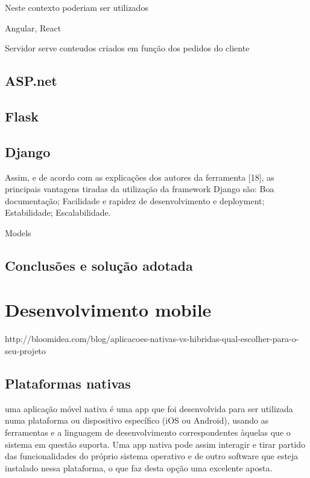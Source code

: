 Neste contexto poderiam ser utilizados 


Angular, React

Servidor serve conteudos criados em função dos pedidos do cliente 







\subsection{ASP.net}

\subsection{Flask}

\subsection{Django}


Assim, e de acordo com as explicações dos autores da ferramenta [18], as
principais vantagens tiradas da utilização da framework Django são:
Boa documentação;
Facilidade e rapidez de desenvolvimento e deployment;
Estabilidade;
Escalabilidade.




Models 


\subsection{Conclusões e solução adotada}



\newpage
\section{Desenvolvimento mobile}


http://bloomidea.com/blog/aplicacoes-nativas-vs-hibridas-qual-escolher-para-o-seu-projeto	

\subsection{Plataformas nativas}


uma aplicação móvel nativa é uma app que foi desenvolvida para ser utilizada numa plataforma ou dispositivo específico (iOS ou Android), usando as ferramentas e a linguagem de desenvolvimento correspondentes àquelas que o sistema em questão suporta. Uma app nativa pode assim interagir e tirar partido das funcionalidades do próprio sistema operativo e de outro software que esteja instalado nessa plataforma, o que faz desta opção uma excelente aposta.


